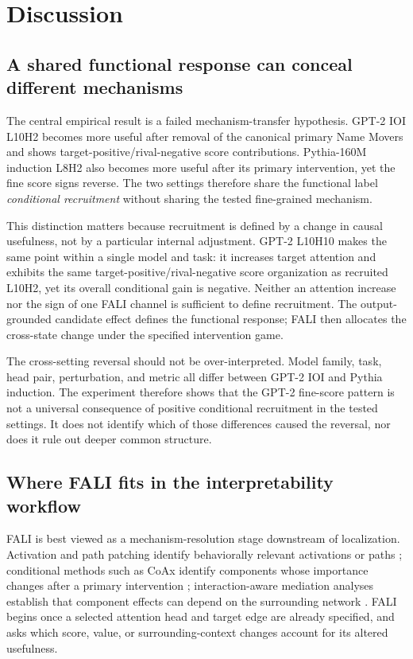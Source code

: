 \section{Discussion}\label{sec:discussion}

\subsection{A shared functional response can conceal different mechanisms}\label{sec:discussion-mechanisms}

The central empirical result is a failed mechanism-transfer hypothesis. GPT-2 IOI L10H2 becomes more useful after removal of the canonical primary Name Movers and shows target-positive/rival-negative score contributions. Pythia-160M induction L8H2 also becomes more useful after its primary intervention, yet the fine score signs reverse. The two settings therefore share the functional label \emph{conditional recruitment} without sharing the tested fine-grained mechanism.

This distinction matters because recruitment is defined by a change in causal usefulness, not by a particular internal adjustment. GPT-2 L10H10 makes the same point within a single model and task: it increases target attention and exhibits the same target-positive/rival-negative score organization as recruited L10H2, yet its overall conditional gain is negative. Neither an attention increase nor the sign of one FALI channel is sufficient to define recruitment. The output-grounded candidate effect defines the functional response; FALI then allocates the cross-state change under the specified intervention game.

The cross-setting reversal should not be over-interpreted. Model family, task, head pair, perturbation, and metric all differ between GPT-2 IOI and Pythia induction. The experiment therefore shows that the GPT-2 fine-score pattern is not a universal consequence of positive conditional recruitment in the tested settings. It does not identify which of those differences caused the reversal, nor does it rule out deeper common structure.

\subsection{Where FALI fits in the interpretability workflow}\label{sec:discussion-positioning}

FALI is best viewed as a mechanism-resolution stage downstream of localization. Activation and path patching identify behaviorally relevant activations or paths \citep{goldowskydill2023pathpatching,zhang2024activationpatching,heimersheim2024activationpatching}; conditional methods such as CoAx identify components whose importance changes after a primary intervention \citep{gong2026coax}; interaction-aware mediation analyses establish that component effects can depend on the surrounding network \citep{vaidyanathan2026curse}. FALI begins once a selected attention head and target edge are already specified, and asks which score, value, or surrounding-context changes account for its altered usefulness.

